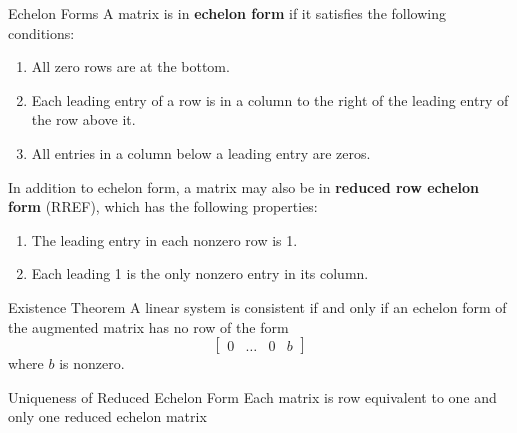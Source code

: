 \begin{definition}{Echelon Forms}
A matrix is in \textbf{echelon form} if it satisfies the following conditions:
\begin{enumerate}
    \item All zero rows are at the bottom.
    \item Each leading entry of a row is in a column to the right of the leading entry of the row above it.
    \item All entries in a column below a leading entry are zeros.
\end{enumerate}

In addition to echelon form, a matrix may also be in \textbf{reduced row echelon form} (RREF), which has the following properties:
\begin{enumerate}[resume]
    \item The leading entry in each nonzero row is 1.
    \item Each leading 1 is the only nonzero entry in its column.
\end{enumerate}
\end{definition}

\begin{theorem}{Existence Theorem}
A linear system is consistent if and only if an echelon form of the augmented matrix has no row of the form
    \[
    \left[\begin{array}{llll}
    0 & \ldots & 0 & b
    \end{array}\right]
    \]
where $b$ is nonzero.
\end{theorem}

\begin{theorem}{Uniqueness of Reduced Echelon Form}
    Each matrix is row equivalent to one and only one reduced echelon matrix
\end{theorem}

